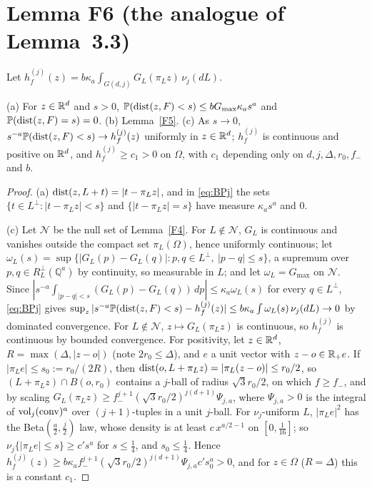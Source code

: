 \documentclass[11pt]{article}
\begin{document}
\section*{Lemma F6 (the analogue of Lemma~3.3)}

Let $h^{(j)}_f(z)=b\kappa_a\int_{G(d,j)}G_L(\pi_Lz)\,\nu_j(dL)$.

\begin{lemma}\label{F6}
(a) For $z\in\mathbb{R}^d$ and $s>0$, $\mathbb{P}(\operatorname{dist}(z,F)<s)\le bG_{\max}\kappa_as^a$ and $\mathbb{P}(\operatorname{dist}(z,F)=s)=0$.
(b) Lemma~\ref{F5}.
(c) As $s\to0$, $s^{-a}\mathbb{P}(\operatorname{dist}(z,F)<s)\to h^{(j)}_f(z)$ uniformly in $z\in\mathbb{R}^d$; $h^{(j)}_f$ is continuous and positive on $\mathbb{R}^d$,
and $h^{(j)}_f\ge c_1>0$ on $\Omega$, with $c_1$ depending only on $d,j,\Delta,r_0,f_-$ and $b$.
\end{lemma}

\begin{proof}
(a) $\operatorname{dist}(z,L+t)=|t-\pi_Lz|$, and in \eqref{eq:BPj} the sets $\{t\in L^\perp:|t-\pi_Lz|<s\}$ and $\{|t-\pi_Lz|=s\}$ have measure $\kappa_as^a$
and $0$.

(c) Let $\mathcal N$ be the null set of Lemma~\ref{F4}. For $L\notin\mathcal N$, $G_L$ is continuous and vanishes outside the compact set
$\pi_L(\Omega)$, hence uniformly continuous; let $\omega_L(s)=\sup\{|G_L(p)-G_L(q)|:p,q\in L^\perp,\ |p-q|\le s\}$, a supremum over
$p,q\in R^\perp_L(\mathbb Q^a)$ by continuity, so measurable in $L$; and let $\omega_L=G_{\max}$ on $\mathcal N$. Since
$|s^{-a}\int_{|p-q|<s}(G_L(p)-G_L(q))\,dp|\le\kappa_a\omega_L(s)$ for every $q\in L^\perp$, \eqref{eq:BPj} gives
$\sup_z|s^{-a}\mathbb{P}(\operatorname{dist}(z,F)<s)-h^{(j)}_f(z)|\le b\kappa_a\int\omega_L(s)\,\nu_j(dL)\to0$ by dominated convergence. For $L\notin\mathcal N$,
$z\mapsto G_L(\pi_Lz)$ is continuous, so $h^{(j)}_f$ is continuous by bounded convergence. For positivity, let $z\in\mathbb{R}^d$,
$R=\max(\Delta,|z-o|)$ (note $2r_0\le\Delta$), and $e$ a unit vector with $z-o\in\mathbb{R}_+e$. If $|\pi_Le|\le s_0:=r_0/(2R)$, then
$\operatorname{dist}(o,L+\pi_Lz)=|\pi_L(z-o)|\le r_0/2$, so $(L+\pi_Lz)\cap B(o,r_0)$ contains a $j$-ball of radius $\sqrt3r_0/2$, on which
$f\ge f_-$, and by scaling $G_L(\pi_Lz)\ge f_-^{j+1}(\sqrt3r_0/2)^{j(d+1)}\Psi_{j,a}$, where $\Psi_{j,a}>0$ is the integral of
$\operatorname{vol}_j(\operatorname{conv})^a$ over $(j+1)$-tuples in a unit $j$-ball. For $\nu_j$-uniform $L$, $|\pi_Le|^2$ has the Beta$(\frac a2,\frac j2)$
law, whose density is at least $c\,x^{a/2-1}$ on $[0,\frac1{16}]$; so $\nu_j\{|\pi_Le|\le s\}\ge c's^a$ for $s\le\frac14$, and $s_0\le\frac14$. Hence
$h^{(j)}_f(z)\ge b\kappa_af_-^{j+1}(\sqrt3r_0/2)^{j(d+1)}\Psi_{j,a}c's_0^a>0$, and for $z\in\Omega$ ($R=\Delta$) this is a constant $c_1$.
\end{proof}
\end{document}
